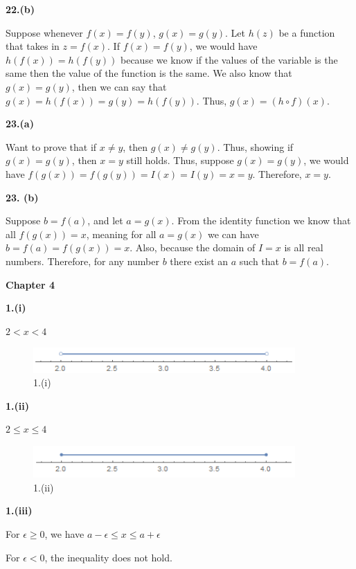 \documentclass[a4paper,12pt]{report}
\begin{document}
\noindent
\textbf{22.(b)}

\noindent
Suppose whenever $f(x)=f(y)$, $g(x)=g(y)$. Let $h(z)$ be a function that takes in $z=f(x)$. If $f(x)=f(y)$, we would have $h(f(x))=h(f(y))$ because we know if the values of the variable is the same then the value of the function is the same. We also know that $g(x)=g(y)$, then we can say that $g(x)=h(f(x))=g(y)=h(f(y))$. Thus, $g(x)=(h\circ f)(x)$. 

\noindent
\textbf{23.(a)}

\noindent
Want to prove that if $x\neq y$, then $g(x)\neq g(y)$. Thus, showing if $g(x)=g(y)$, then $x=y$ still holds. Thus, suppose $g(x)=g(y)$, we would have $f(g(x))=f(g(y))=I(x)=I(y)=x=y$. Therefore, $x=y$.

\noindent
\textbf{23. (b)}

\noindent
Suppose $b=f(a)$, and let $a=g(x)$. From the identity function we know that all $f(g(x))=x$, meaning for all $a=g(x)$ we can have $b=f(a)=f(g(x))=x$. Also, because the domain of $I=x$ is all real numbers. Therefore, for any number $b$ there exist an $a$ such that $b=f(a)$.

\pagebreak
\noindent
\textbf{Chapter 4}

\noindent
\textbf{1.(i)}

\noindent
$2<x<4$

\begin{figure}[h]
  \centering
  \includegraphics[width=10cm]{Pics/Chap41(i).png}
  \caption{1.(i)}
\end{figure}

\noindent
\textbf{1.(ii)}

\noindent
$2\leq x\leq4$

\begin{figure}[h]
  \centering
  \includegraphics[width=10cm]{./Pics/Chap41(ii).png}
  \caption{1.(ii)}
\end{figure}

\noindent
\textbf{1.(iii)}

\noindent
For $\epsilon \geq 0$, we have $a-\epsilon \leq x \leq a+\epsilon$

\noindent
For $\epsilon < 0$, the inequality does not hold. 
\end{document}
